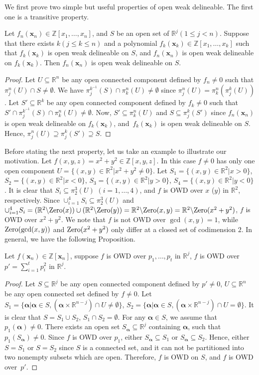 \documentclass[amsthm]{elsart}
\def  \zero {{\rm Zero}}
\def \RR {{\mathbb R}}
\def \ZZ {{\mathbb Z}}
\newcommand{\va}{\bm{\alpha}}
\newcommand{\xx}{\bm{x}}
\begin{document}
We first prove two simple but useful properties of open weak delineable. The first one is a transitive property.\begin{prop}  \label{prop:weaktransitive}
 Let $f_n(\xx_n)\in\ZZ[x_1,\ldots,x_n]$, and $S$ be an open set of $\RR^j (1\le j< n)$. Suppose that there exists $k (j\le k\le n)$ and a polynomial $f_k(\xx_k)\in\ZZ[x_1,\ldots,x_k]$ such that $f_k(\xx_k)$ is open weak delineable on $S$, and $f_n(\xx_n)$ is open weak delineable on $f_k(\xx_k)$. Then $f_n(\xx_n)$ is open weak delineable on $S$.
\end{prop}
\begin{proof}
Let $U\subseteq \RR^n$ be any open connected component defined by $f_n\neq0$ such that $\pi_j^n(U)\cap S\neq\emptyset$. We have $\pi_j^{k^{-1}}(S)\cap\pi_k^n(U)\neq\emptyset$ since $\pi_j^n(U)=\pi_k^n(\pi_j^k(U))$. Let $S'\subseteq \RR^k$ be any open connected component defined by $f_k\neq0$ such that $S'\cap \pi_j^{k^{-1}}(S)\cap\pi_k^n(U)\neq\emptyset$. Now, $S'\subseteq \pi_k^n(U)$ and $S\subseteq\pi_{j}^k(S')$ since $f_n(\xx_n)$ is open weak delineable on $f_k(\xx_k)$, and~$f_k(\xx_k)$ is open weak delineable on $S$. Hence, $\pi_j^n(U)\supseteq \pi_{j}^k(S')\supseteq S$.
\end{proof}
Before stating the next property, let us take an example to illustrate our motivation. Let $f(x,y,z)=x^2+y^2\in\ZZ[x,y,z]$. In this case $f\neq0$ has only one open component $U=\{(x,y)\in\RR^2|x^2+y^2\neq0\}$. Let $S_1=\{(x,y)\in\RR^2|x>0\}$, $S_2=\{(x,y)\in\RR^2|x<0\}$, $S_3=\{(x,y)\in\RR^2|y>0\}$, $S_4=\{(x,y)\in\RR^2|y<0\}$. It is clear that $S_i\subseteq \pi_2^3 (U)$ $(i=1,\ldots,4)$, and $f$ is OWD over $x$ ($y$) in $\RR^2$, respectively. Since $\cup_{i=1}^4 S_i\subseteq \pi_2^3 (U)$ and $\cup_{i=1}^4 S_i=(\RR^2\backslash\zero(x))\cup(\RR^2\backslash\zero(y))=\RR^2\backslash\zero(x,y)=\RR^2\backslash\zero(x^2+y^2)$,
 $f$ is OWD over $x^2+y^2$. We note that $f$ is not OWD over $\gcd(x,y)=1$, while $\zero(\gcd(x,y))$ and $\zero(x^2+y^2)$ only differ at a closed set of codimension $2$. In general, we have the following Proposition.
\begin{prop} \label{prop:weakgcd}
 Let $f(\xx_n)\in\ZZ[\xx_n]$, suppose $f$ is OWD over $p_1,\ldots,p_t$ in $\RR^j$, $f$ is OWD over $p'=\sum_{i=1}^t p_i^2$ in $\RR^j$.\end{prop}

\begin{proof}
Let $S\subseteq\RR^j$ be any open connected component defined by $p'\neq0$, $U\subseteq\RR^n$ be any open connected set defined by $f\neq0$. Let $S_1=\{\va|\va\in S,(\va\times\RR^{n-j})\cap U\neq\emptyset\}$, $S_2=\{\va|\va\in S,(\va\times\RR^{n-j})\cap U=\emptyset\}$. It is clear that $S=S_1\cup S_2$, $S_1\cap S_2=\emptyset$. For any $\va\in S$, we assume that $p_1(\va)\neq0$. There exists an open set $S_{\va}\subseteq \RR^j$ containing $\va$, such that $p_1(S_{\va})\neq0$. Since $f$ is OWD over $p_1$, either $S_{\va}\subseteq S_1$ or $S_{\va}\subseteq S_2$. Hence, either $S=S_1$ or $S=S_2$ since $S$ is a connected set, and it can not be partitioned into two nonempty subsets which are open. Therefore, $f$ is OWD on $S$, and $f$ is OWD over~$p'$.
\end{proof}
\end{document}
